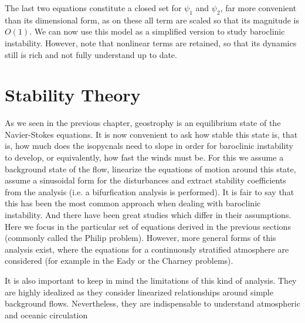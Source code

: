 The last two equations constitute a closed set for $\psi_1$ and $\psi_2$,
far more convenient than its dimensional form, as on these all term are
scaled so that its magnitude is $O(1)$. We can now use this model as a
simplified version to study baroclinic instability. However, note that
nonlinear terms are retained, so that its dynamics still is rich and not
fully understand up to date.

\section{Stability Theory}
\label{s:stability}

As we seen in the previous chapter, geostrophy is an equilibrium state of the Navier-Stokes equations. It is now convenient to ask how stable this state is, that is, how much does the isopycnals need to slope in order for baroclinic instability to develop, or equivalently, how fast the winds must be. For this we assume a background state of the flow, linearize the equations of motion around this state, assume a sinusoidal form for the disturbances and extract stability coefficients from the analysis (i.e. a bifurfication analysis is performed). It is fair to say that this has been the most common approach when dealing with baroclinic instability. And there have been great studies which differ in their assumptions. Here we focus in the particular set of equations derived in the previous sections (commonly called the Philip problem). However, more general forms of this analysis exist, where the equations for a continuously stratified atmosphere are considered (for example in the Eady or the Charney problems).

It is also important to keep in mind the limitations of this kind of analysis. They are highly idealized as they consider linearized relationships around simple background flows. Nevertheless, they are indispensable to understand atmospheric and oceanic circulation

